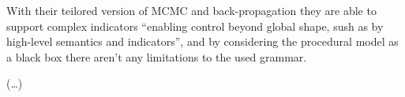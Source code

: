 With their teilored version of MCMC and back-propagation they are able to support complex indicators ``enabling control beyond global shape, sush as by high-level semantics and indicators'', and by considering the procedural model as a black box there aren't any limitations to the used grammar.




















(\dots)

